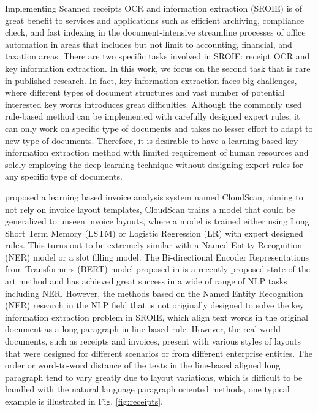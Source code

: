 \documentclass[10pt,twocolumn,letterpaper]{article}
\begin{document}
Implementing Scanned receipts OCR and information extraction (SROIE) is of great benefit to services and applications such as efficient archiving, compliance check, and fast indexing in the document-intensive streamline processes of office automation in areas that includes but not limit to accounting, financial, and taxation areas. There are two specific tasks involved in SROIE: receipt OCR and key information extraction. In this work, we focus on the second task that is rare in published research. In fact, key information extraction faces big challenges, where different types of document structures and vast number of potential interested key words introduces great difficulties. Although the commonly used rule-based method can be implemented with carefully designed expert rules, it can only work on specific type of documents and takes no lesser effort to adapt to new type of documents. Therefore, it is desirable to have a learning-based key information extraction method with limited requirement of human resources and solely employing the deep learning technique without designing expert rules for any specific type of documents. 

\cite{cloudscan} proposed a learning based invoice analysis system named CloudScan, aiming to not rely on invoice layout templates, CloudScan trains a model that could be generalized to unseen invoice layouts, where a model is trained either using Long Short Term Memory (LSTM) or Logistic Regression (LR) with expert designed rules. This turns out to be extremely similar with a Named Entity Recognition (NER) model or a slot filling model. The Bi-directional Encoder Representations from Transformers (BERT) model proposed in \cite{bert} is a recently proposed state of the art method and has achieved great success in a wide of range of NLP tasks including NER. However, the methods based on the Named Entity Recognition (NER) research in the NLP field that is not originally designed to solve the key information extraction problem in SROIE, which align text words in the original document as a long paragraph in line-based rule. However, the real-world documents, such as receipts and invoices, present with various styles of layouts that were designed for different scenarios or from different enterprise entities. The order or word-to-word distance of the texts in the line-based aligned long paragraph tend to vary greatly due to layout variations, which is difficult to be handled with the natural language paragraph oriented methods, one typical example is illustrated in Fig. \ref{fig:receipts}.
\end{document}
